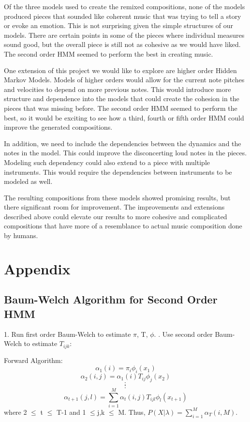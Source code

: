 \documentclass{article} %
\begin{document}
Of the three models used to create the remixed compositions, none of the models produced pieces that sounded like coherent music that was trying to tell a story or evoke an emotion. This is not surprising given the simple structures of our models. There are certain points in some of the pieces where individual measures sound good, but the overall piece is still not as cohesive as we would have liked. The second order HMM seemed to perform the best in creating music. 

One extension of this project we would like to explore are higher order Hidden Markov Models. Models of higher orders would allow for the current note pitches and velocities to depend on more previous notes. This would introduce more structure and dependence into the models that could create the cohesion in the pieces that was missing before. The second order HMM seemed to perform the best, so it would be exciting to see how a third, fourth or fifth order HMM could improve the generated compositions. 

In addition, we need to include the dependencies between the dynamics and the notes in the model. This could improve the disconcerting loud notes in the pieces. Modeling such dependency could also extend to a piece with multiple instruments. This would require the dependencies between instruments to be modeled as well. 

The resulting compositions from these models showed promising results, but there significant room for improvement. The improvements and extensions described above could elevate our results to more cohesive and complicated compositions that have more of a resemblance to actual music composition done by humans. 


\newpage

\section{Appendix}

\subsection{Baum-Welch Algorithm for Second Order HMM}
\label{2ndHMM}
1. Run first order Baum-Welch to estimate $\pi$, T, $\phi$. . Use second order Baum-Welch to estimate $T_{ijk}$:\newline

Forward Algorithm: \newline
$$\alpha_1(i) = \pi_i \phi_i(x_1)$$
$$\alpha_2(i,j) = \alpha_1(i) T_{ij} \phi_j(x_2)$$
$$:$$
$$:$$
$$\alpha_{t+1}(j, l) = \sum_{i=1}^M \alpha_t(i,j) T_{ijl} \phi_l(x_{t+1})$$
where 2 $\leq$ t $\leq$ T-1 and 1 $\leq$j,k $\leq$  M. \newline
Thus, $P(X | \lambda) = \sum_{i=1}^M \alpha_T(i,M)$. \newline
\end{document}
